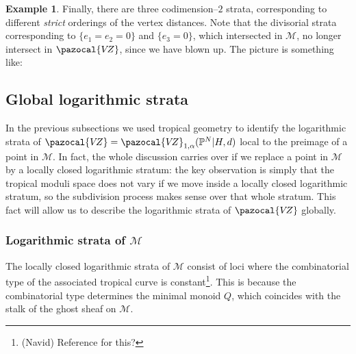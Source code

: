 \documentclass[11pt]{amsart}
\newcommand{\PP}{\mathbb P}
\newcommand{\VZ}{\pazocal{V\!Z}}
\newcommand{\Mcal}{\mathcal{M}}
\theoremstyle{definition}
\theoremstyle{definition}
\newtheorem{example}[thm]{Example}
\begin{document}
\begin{example}
Finally, there are three codimension--$2$ strata, corresponding to different \emph{strict} orderings of the vertex distances. Note that the divisorial strata corresponding to $\{e_1=e_2=0\}$ and $\{e_3=0\}$, which intersected in $\Mcal$, no longer intersect in $\VZ$, since we have blown up. The picture is something like:
\begin{center}
\end{center}

\end{example}

\subsection{Global logarithmic strata}
In the previous subsections we used tropical geometry to identify the logarithmic strata of $\VZ=\VZ_{1,\alpha}(\PP^N|H,d)$ local to the preimage of a point in $\Mcal$. In fact, the whole discussion carries over if we replace a point in $\Mcal$ by a locally closed logarithmic stratum: the key observation is simply that the tropical moduli space does not vary if we move inside a locally closed logarithmic stratum, so the subdivision process makes sense over that whole stratum. This fact will allow us to describe the logarithmic strata of $\VZ$ globally.

\subsubsection{Logarithmic strata of $\Mcal$} The locally closed logarithmic strata of $\Mcal$ consist of loci where the combinatorial type of the associated tropical curve is constant\footnote{(Navid) Reference for this?}. This is because the combinatorial type determines the minimal monoid $Q$, which coincides with the stalk of the ghost sheaf on $\Mcal$.
\end{document}
